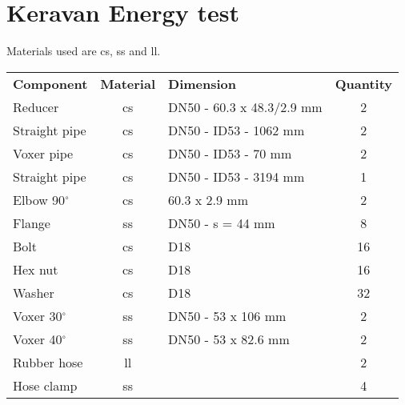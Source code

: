 \section{Keravan Energy test}
Materials used are \gls{cs}, \gls{ss} and \gls{ll}.
\begin{table}[h!]
\centering
\begin{tabular}{lclc}
\textbf{Component} & \textbf{Material} & \textbf{Dimension}        & \textbf{Quantity} \\
Reducer            & \gls{cs}                & DN50 - 60.3 x 48.3/2.9 mm & 2                 \\
Straight pipe      & \gls{cs}               & DN50 - ID53 - 1062 mm     & 2                 \\
Voxer pipe         & \gls{cs}                & DN50 - ID53 - 70 mm       & 2                 \\
Straight pipe      & \gls{cs}              & DN50 - ID53 - 3194 mm     & 1                 \\
Elbow 90$^{\circ}$           & \gls{cs}               & 60.3 x 2.9 mm             & 2                 \\
Flange             & \gls{ss}               & DN50 - s = 44 mm          & 8                 \\
Bolt               & \gls{cs}                & D18                       & 16                \\
Hex nut            & \gls{cs}               & D18                       & 16                \\
Washer             & \gls{cs}               & D18                       & 32                \\
Voxer 30$^{\circ}$           & \gls{ss}                & DN50 - 53 x 106 mm        & 2                 \\
Voxer 40$^{\circ}$           & \gls{ss}               & DN50 - 53 x 82.6 mm       & 2                 \\
Rubber hose        &  \gls{ll}             &                           & 2                 \\
Hose clamp         & \gls{ss}                &                           & 4                
\end{tabular}
\end{table}

\clearpage